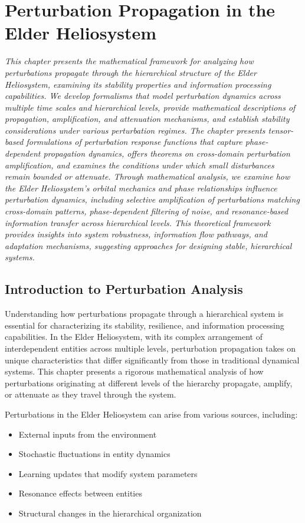 \chapter{Perturbation Propagation in the Elder Heliosystem}

\textit{This chapter presents the mathematical framework for analyzing how perturbations propagate through the hierarchical structure of the Elder Heliosystem, examining its stability properties and information processing capabilities. We develop formalisms that model perturbation dynamics across multiple time scales and hierarchical levels, provide mathematical descriptions of propagation, amplification, and attenuation mechanisms, and establish stability considerations under various perturbation regimes. The chapter presents tensor-based formulations of perturbation response functions that capture phase-dependent propagation dynamics, offers theorems on cross-domain perturbation amplification, and examines the conditions under which small disturbances remain bounded or attenuate. Through mathematical analysis, we examine how the Elder Heliosystem's orbital mechanics and phase relationships influence perturbation dynamics, including selective amplification of perturbations matching cross-domain patterns, phase-dependent filtering of noise, and resonance-based information transfer across hierarchical levels. This theoretical framework provides insights into system robustness, information flow pathways, and adaptation mechanisms, suggesting approaches for designing stable, hierarchical systems.}

\section{Introduction to Perturbation Analysis}

Understanding how perturbations propagate through a hierarchical system is essential for characterizing its stability, resilience, and information processing capabilities. In the Elder Heliosystem, with its complex arrangement of interdependent entities across multiple levels, perturbation propagation takes on unique characteristics that differ significantly from those in traditional dynamical systems. This chapter presents a rigorous mathematical analysis of how perturbations originating at different levels of the hierarchy propagate, amplify, or attenuate as they travel through the system.

Perturbations in the Elder Heliosystem can arise from various sources, including:
\begin{itemize}
    \item External inputs from the environment
    \item Stochastic fluctuations in entity dynamics
    \item Learning updates that modify system parameters
    \item Resonance effects between entities
    \item Structural changes in the hierarchical organization
\end{itemize}


